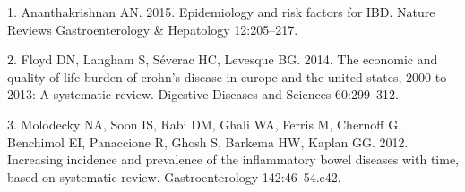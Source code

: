 \documentclass[11pt,]{article}
\begin{document}
\hypertarget{refs}{}
\hypertarget{ref-Ananthakrishnan_2015}{}
1. Ananthakrishnan AN. 2015. Epidemiology and risk factors for IBD.
Nature Reviews Gastroenterology \& Hepatology 12:205--217.

\hypertarget{ref-Floyd_2014}{}
2. Floyd DN, Langham S, Séverac HC, Levesque BG. 2014. The economic and
quality-of-life burden of crohn's disease in europe and the united
states, 2000 to 2013: A systematic review. Digestive Diseases and
Sciences 60:299--312.

\hypertarget{ref-Molodecky_2012}{}
3. Molodecky NA, Soon IS, Rabi DM, Ghali WA, Ferris M, Chernoff G,
Benchimol EI, Panaccione R, Ghosh S, Barkema HW, Kaplan GG. 2012.
Increasing incidence and prevalence of the inflammatory bowel diseases
with time, based on systematic review. Gastroenterology 142:46--54.e42.
\end{document}
